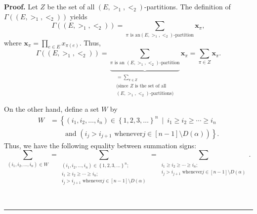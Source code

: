 \documentclass[numbers=enddot,12pt,final,onecolumn,notitlepage,abstracton]{scrartcl}
\theoremstyle{definition}
\newenvironment{proof}[1][Proof]{\noindent\textbf{#1.} }{\ \rule{0.5em}{0.5em}}
\let\sumnonlimits\sum
\let\prodnonlimits\prod
\renewcommand{\sum}{\sumnonlimits\limits}
\renewcommand{\prod}{\prodnonlimits\limits}
\newenvironment{verlong}{}{}
\begin{document}
\begin{verlong}
\begin{footnotesize}
\begin{proof}
Let $Z$ be the set of all $\left(  E,>_{1},<_{2}\right)  $-partitions. The
definition of $\Gamma\left(  \left(  E,>_{1},<_{2}\right)  \right)  $ yields%
\[
\Gamma\left(  \left(  E,>_{1},<_{2}\right)  \right)  =\sum_{\pi\text{ is an
}\left(  E,>_{1},<_{2}\right)  \text{-partition}}{\mathbf{x}}_{\pi},
\]
where ${\mathbf{x}}_{\pi}=\prod_{e\in E}x_{\pi\left(  e\right)  }$. Thus,%
\begin{equation}
\Gamma\left(  \left(  E,>_{1},<_{2}\right)  \right)  =\underbrace{\sum
_{\pi\text{ is an }\left(  E,>_{1},<_{2}\right)  \text{-partition}}%
}_{\substack{=\sum_{\pi\in Z}\\\text{(since }Z\text{ is the set of
all}\\\left(  E,>_{1},<_{2}\right)  \text{-partitions)}}}{\mathbf{x}}_{\pi
}=\sum_{\pi\in Z}\mathbf{x}_{\pi}. \label{pf.prop.example.Gamma.Sc3.Gamma=}%
\end{equation}


On the other hand, define a set $W$ by%
\begin{align}
W  &  =\left\{  \left(  i_{1},i_{2},\ldots,i_{n}\right)  \in\left\{
1,2,3,\ldots\right\}  ^{n}\ \mid\ i_{1}\geq i_{2}\geq\cdots\geq i_{n}\right.
\nonumber\\
&  \ \ \ \ \ \ \ \ \ \ \left.  \text{and }\left(  i_{j}>i_{j+1}\text{ whenever
}j\in\left[  n-1\right]  \setminus D\left(  \alpha\right)  \right)  \right\}
. \label{pf.prop.example.Gamma.Sc3.W=}%
\end{align}
Thus, we have the following equality between summation signs:%
\[
\sum_{\left(  i_{1},i_{2},\ldots,i_{n}\right)  \in W}=\sum_{\substack{\left(
i_{1},i_{2},\ldots,i_{n}\right)  \in\left\{  1,2,3,\ldots\right\}
^{n};\\i_{1}\geq i_{2}\geq\cdots\geq i_{n};\\i_{j}>i_{j+1}\text{ whenever
}j\in\left[  n-1\right]  \setminus D\left(  \alpha\right)  }}=\sum
_{\substack{i_{1}\geq i_{2}\geq\cdots\geq i_{n};\\i_{j}>i_{j+1}\text{ whenever
}j\in\left[  n-1\right]  \setminus D\left(  \alpha\right)  }}.
\]



\end{proof}
\end{footnotesize}
\end{verlong}
\end{document}
